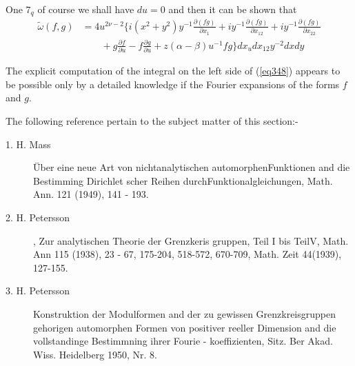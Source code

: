 One $7_q$ of course we shall have $du = 0$ and then it can be shown
that 
\begin{align*}
\tilde{\omega}(f , g) & = 4 u^{2 \nu - 2} \bigg\{ i(x^2 + y^2) y^{-1 }
\frac{\partial (f g)}{\partial x_1} + i y^{-1} \frac{\partial (f
  g)}{\partial x_{12}} + iy^{-1} \frac{\partial(f g)}{ \partial
  x_{22}} \\
& \qquad + g \frac{\partial f}{\partial u} - f \frac {\partial
  g}{\partial u} + z ( \alpha - \beta) u ^{-1} f g \bigg \} dx_u
dx_{12} y^{-2} dx dy \tag{349}\label{eq349}   
\end{align*}

The explicit computation of the integral on the left side of (\ref{eq348})
appears to be possible only by a detailed knowledge if the Fourier
expansions of the forms $f$ and $g$. 

The following reference pertain to the subject matter of this
section:- 
\begin{description}
\item[1. H. Mass] \"Uber eine neue Art von nichtanalytischen
  automorphen\break Funktionen and die Bestimming Dirichlet scher Reihen
  durch\break Funktionalgleichungen, Math. Ann. 121 (1949), 141 - 193. 

\item[2.  H. Petersson], Zur analytischen Theorie der Grenzkeris
  gruppen, Teil I bis TeilV, Math. Ann 115 (1938), 23 - 67, 175-204,
  518-572, 670-709, Math. Zeit 44(1939), 127-155.  
 
\item[3. H. Petersson]\pageoriginale Konstruktion der Modulformen and
  der zu   gewissen Grenzkreisgruppen gehorigen automorphen Formen von
  positiver reeller Dimension and die vollstandinge Bestimmning ihrer\break
  Fourie - koeffizienten, Sitz. Ber Akad. Wiss. Heidelberg 1950,
  Nr. 8.  
\end{description}

